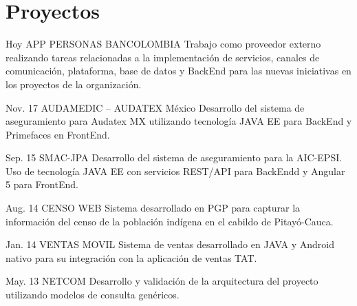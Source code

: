 \documentclass[]{cv-class}
\begin{document}
\section{Proyectos}
\begin{entrylist}
	\entry
	{Hoy}
	{APP PERSONAS BANCOLOMBIA}
	{\href{https://www.grupobancolombia.com/personas}{ }}
	{Trabajo como proveedor externo realizando tareas relacionadas a la implementación de servicios, canales de comunicación, plataforma, base de datos y BackEnd para las nuevas iniciativas en los proyectos de la organización.}
	
	\entry
	{Nov. 17}
	{AUDAMEDIC – AUDATEX México}
	{\href{https://sitis.com.co/}{ }}
	{Desarrollo del sistema de aseguramiento para Audatex MX utilizando tecnología JAVA EE para BackEnd y Primefaces en FrontEnd.}
	  
	\entry
	{Sep. 15}
	{SMAC-JPA}
	{ }
	{Desarrollo del sistema de aseguramiento para la AIC-EPSI. Uso de tecnología JAVA EE con servicios REST/API para BackEndd y Angular 5 para FrontEnd.}
	
	\entry
	{Aug. 14}
	{CENSO WEB}
	{ }
	{Sistema desarrollado en PGP para capturar la información del censo de la población indígena en el cabildo de Pitayó-Cauca.}
	
	\entry
	{Jan. 14}
	{VENTAS MOVIL}
	{ }
	{Sistema de ventas desarrollado en JAVA y Android nativo para su integración con la aplicación de ventas TAT.}
	
	\entry
	{May. 13}
	{NETCOM}
	{ }
	{Desarrollo y validación de la arquitectura del proyecto utilizando modelos de consulta genéricos.}
	
\end{entrylist}
\end{document}
